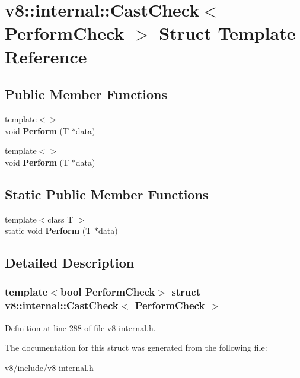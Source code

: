 \hypertarget{structv8_1_1internal_1_1CastCheck}{}\section{v8\+:\+:internal\+:\+:Cast\+Check$<$ Perform\+Check $>$ Struct Template Reference}
\label{structv8_1_1internal_1_1CastCheck}
\subsection*{Public Member Functions}
\begin{DoxyCompactItemize}
\item 
\mbox{\label{structv8_1_1internal_1_1CastCheck_a0a213344d48ca226529f7ebd6edd6f3e}} 
{\footnotesize template$<$$>$ }\\void {\bfseries Perform} (T $\ast$data)
\item 
\mbox{\label{structv8_1_1internal_1_1CastCheck_ab169a4db19476037fa7f64bb2f5b1ccf}} 
{\footnotesize template$<$$>$ }\\void {\bfseries Perform} (T $\ast$data)
\end{DoxyCompactItemize}
\subsection*{Static Public Member Functions}
\begin{DoxyCompactItemize}
\item 
\mbox{\label{structv8_1_1internal_1_1CastCheck_a79edb0718f67826a1c2c1eba5a5a9bf5}} 
{\footnotesize template$<$class T $>$ }\\static void {\bfseries Perform} (T $\ast$data)
\end{DoxyCompactItemize}


\subsection{Detailed Description}
\subsubsection*{template$<$bool Perform\+Check$>$\newline
struct v8\+::internal\+::\+Cast\+Check$<$ Perform\+Check $>$}



Definition at line 288 of file v8-\/internal.\+h.



The documentation for this struct was generated from the following file\+:\begin{DoxyCompactItemize}
\item 
v8/include/v8-\/internal.\+h\end{DoxyCompactItemize}
